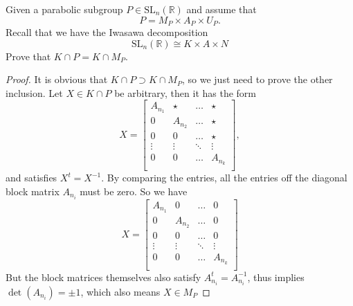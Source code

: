 \documentclass[12pt]{article} %
\begin{document}
\begin{tcolorbox}[colback=blue!5!white,colframe=blue!75!black,title=Problem 3]
  Given a parabolic subgroup $P \in \text{SL}_n(\mathbb{R})$ and assume that
  \[P = M_P \times A_P \times U_P.\]
  Recall that we have the Iwasawa decomposition
  \[ \text{SL}_n(\mathbb{R}) \cong K \times A \times N\]
  Prove that $K \cap P = K \cap M_P$.
\end{tcolorbox}
\begin{proof}
  It is obvious that $K \cap P \supset K \cap M_P$, so we just need to prove the other inclusion. Let $X \in K \cap P$
  be arbitrary, then it has the form
  \[X = \begin{bmatrix}
      A_{n_1} & \star   & \ldots & \star   \\
      0       & A_{n_2} & \ldots & \star   \\
      0       & 0       & \ldots & \star   \\
      \vdots  & \vdots  & \ddots & \vdots  \\
      0       & 0       & \ldots & A_{n_k} \\
    \end{bmatrix},\]
  and satisfies $X^t = X^{-1}$. By comparing the entries, all the entries off the diagonal block matrix $A_{n_i}$
  must be zero. So we have
  \[X = \begin{bmatrix}
      A_{n_1} & 0       & \ldots & 0       \\
      0       & A_{n_2} & \ldots & 0       \\
      0       & 0       & \ldots & 0       \\
      \vdots  & \vdots  & \ddots & \vdots  \\
      0       & 0       & \ldots & A_{n_k} \\
    \end{bmatrix}\]
  But the block matrices themselves also satisfy $A_{n_i}^t = A_{n_i}^{-1}$, thus implies
  $\det(A_{n_i}) = \pm 1$, which also means $X \in M_P$
\end{proof}
\end{document}
